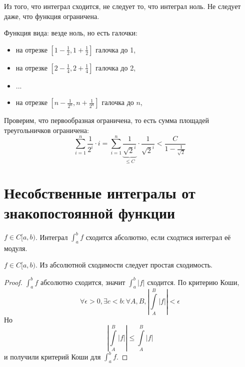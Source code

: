 \begin{Rem}
	Из того, что интеграл сходится, не следует то, что интеграл ноль.
	Не следует даже, что функция ограничена.
\end{Rem}
\begin{exmp}
	Функция вида: везде ноль, но есть галочки:
	\begin{itemize}
		\item на отрезке $\left[1 - \frac12, 1 + \frac12\right]$ галочка до 1,
		\item на отрезке $\left[2 - \frac14, 2 + \frac14\right]$ галочка до 2,
		\item ...
		\item на отрезке $\left[n - \frac1{2^n}, n + \frac1{2^n}\right]$ галочка до $n$,
	\end{itemize}
	Проверим, что первообразная ограничена, то есть сумма площадей треугольничков ограничена:
	\[
		\sum_{i=1}^n \frac1{2^i} \cdot i
		= \sum_{i=1}^n \underbrace{\frac1{\sqrt{2}^i}}_{\le C} \cdot \frac1{\sqrt{2}^i}
		< \frac{C}{1-\frac1{\sqrt 2}}
	\]
\end{exmp}

\section{Несобственные интегралы от знакопостоянной функции}

\begin{Def}
	$f \in C[a, b)$.
	Интеграл $\int_a^b f$ сходится абсолютно, если сходтися интеграл её модуля.
\end{Def}

\begin{theorem}
	$f \in C[a, b)$.
	Из абсолютной сходимости следует простая сходимость.
\end{theorem}
\begin{proof}
	$\int_a^b f$ абсолютно сходится, значит $\int_a^b |f|$ сходится.
	По критерию Коши,
	\[ \forall \epsilon > 0, \exists c < b\colon \forall A, B, \left|\int\limits_A^B |f|\right| < \epsilon \]
	Но
	\[ \left|\int\limits_A^B |f|\right| \le \int\limits_A^B |f| \]
	и получили критерий Коши для $\int_a^b f$.
\end{proof}
